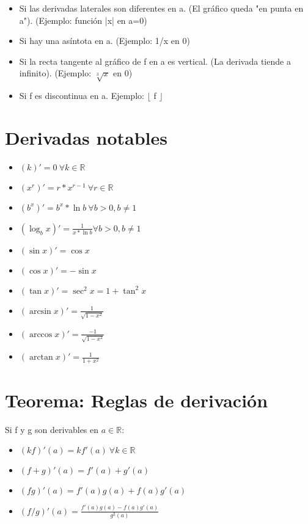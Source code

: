 \documentclass{report}
\begin{document}
		\begin{itemize}
			\item Si las derivadas laterales son diferentes en a. (El gráfico queda "en punta en a"). (Ejemplo: función |x| en a=0)
			
			\item Si hay una asíntota en a. (Ejemplo: 1/x en 0)
			
			\item Si la recta tangente al gráfico de f en a es vertical. (La derivada tiende a infinito). (Ejemplo: $\sqrt[3]{x}$ en 0)
			
			\item Si f es discontinua en a. Ejemplo: $\lfloor$ f $\rfloor$
		\end{itemize}
	
	\section{Derivadas notables}
	
		\begin{itemize}
			\item $(k)'=0 \ \forall k \in \mathbb{R}$
			\item $(x^r)'=r*x^{r-1} \ \forall r \in \mathbb{R}$
			\item $(b^x)'=b^x*\ln b  \ \forall b >0, b \neq 1$
			\item $(\log_b x)' = \frac{1}{x*\ln b} \forall b >0, b \neq 1$
			\item $(\sin x)' = \cos x$
			\item $(\cos x)' = -\sin x$
			\item $(\tan x)' = \sec^2 x = 1+\tan^2 x$
			\item $(\arcsin x)' = \frac{1}{\sqrt{1-x^2}}$
			\item $(\arccos x)' = \frac{-1}{\sqrt{1-x^2}}$
			\item $(\arctan x)' = \frac{1}{1+x^2}$
		\end{itemize}
	
	\section{Teorema: Reglas de derivación}
		Si f y g son derivables en $a \in \mathbb{R}$:
		
			\begin{itemize}
				\item $(kf)'(a) = kf'(a) \ \forall k \in \mathbb{R}$
				\item $(f+g)'(a) = f'(a)+g'(a)$
				\item $(fg)'(a) = f'(a)g(a)+f(a)g'(a)$
				\item $(f/g)'(a) = \frac{f'(a)g(a)-f(a)g'(a)}{g^2(a)}$
			\end{itemize}
		
\end{document}
